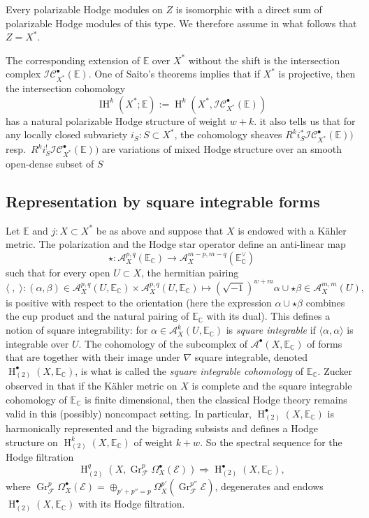 \documentclass[12pt,letterpaper]{amsart}
\numberwithin{equation}{section}
\def\CC{{\mathbb C}}
\def\EE{{\mathbb E}}
\def\Ascr{{\mathscr A}}
\def\Ecal{{\mathcal E}}
\def\Fcal{{\mathcal F}}
\def\Iscr{{\mathscr I}}
\def\Cscr{{\mathscr C}}
\def\la{\langle}
\def\ra{\rangle}
\def\pt{{\scriptscriptstyle\bullet}}
\newcommand\Gr{\operatorname{Gr}}
\newcommand\Hl{\operatorname{H}}
\newcommand\IH{\operatorname{IH}}
\theoremstyle{remark}
\begin{document}
Every  polarizable Hodge modules on $Z$ is isomorphic with a direct sum of polarizable Hodge modules of this type. We therefore assume 
in what follows that $Z=X^*$.

The corresponding extension of $\EE$ over $X^*$ without the shift is the  intersection complex $\Iscr\Cscr_{X^*}^\pt(\EE)$. 
One of Saito's theorems implies  that if $X^*$ is projective, then the intersection cohomology 
\[
\IH^k(X^*; \EE):=\Hl^k(X^*, \Iscr\Cscr_{X^*}^\pt(\EE))
\]
 has a natural polarizable Hodge structure of weight 
$w+k$. it also tells us that  for any locally closed subvariety $i_S: S\subset X^*$,  the cohomology  sheaves 
$R^k i^*_S\Iscr\Cscr_{X^*}^\pt(\EE))$ resp.\  $R^k i^!_S\Iscr\Cscr_{X^*}^\pt(\EE))$ are variations of mixed Hodge structure
over an smooth open-dense subset of  $S$

\subsection*{Representation by square integrable forms}
Let $\EE$ and $j:X\subset X^*$ be as above and suppose that $X$ is endowed with a K\"ahler metric. 
The polarization and the Hodge star  operator define an anti-linear map 
\[
\star: \Ascr^{p,q}_X(\EE_\CC)\to \Ascr^{m-p,m-q}_X(\EE_\CC^\vee)
\]
such that for every open $U\subset X$, the hermitian pairing 
\[
\la\;,\; \ra: (\alpha, \beta)\in \Ascr^{p,q}_X(U,\EE_\CC)\times \Ascr^{p,q}_X(U,\EE_\CC)\mapsto  
(\sqrt{-1})^{w+m} \alpha\cup\star\beta\in \Ascr^{m,m}_X(U),
\]
is positive with respect to the orientation (here the expression 
$\alpha\cup\star\beta$ combines  the cup product and the natural pairing of $\EE_\CC$ with its dual).
This defines a notion of square integrability: for
$\alpha\in \Ascr^k_X(U,\EE_\CC)$ is  \emph{square integrable} if $\la \alpha, \alpha\ra$ is integrable over $U$.  
The  cohomology of the  subcomplex of  $\Ascr^\pt(X,\EE_\CC)$  of forms that are together with their image under 
$\nabla$ square integrable, denoted 
$\Hl^\pt_{(2)}(X, \EE_\CC)$, is what is called the \emph{square integrable cohomology} of $\EE_\CC$. 
Zucker observed  in \cite{zucker:warped} that  if the K\"ahler metric on $X$ is complete and the square integrable 
cohomology of $\EE_\CC$ is finite dimensional, then the classical Hodge theory remains valid in this (possibly) noncompact setting. 
In particular, $\Hl^\pt_{(2)}(X, \EE_\CC)$ is 
harmonically represented and the  bigrading subsists and defines a Hodge structure on $\Hl^k_{(2)}(X, \EE_\CC)$ of weight $k+w$. So the spectral sequence for the Hodge filtration
\[
\Hl^q_{(2)}(X,\Gr_\Fcal^p \Omega_X^\pt(\Ecal))\Rightarrow  \Hl_{(2)}^\pt(X, \EE_\CC),
\]
where $\Gr_\Fcal^p \Omega_X^\pt(\Ecal)=\oplus_{p'+p''=p} \Omega_X^{p'}(\Gr_\Fcal^{p''}\Ecal)$,
degenerates  and endows $\Hl_{(2)}^\pt(X, \EE_\CC)$ with its Hodge filtration.
\end{document}
